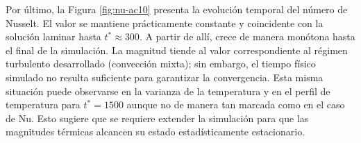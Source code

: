 Por último, la Figura \ref{fig:nu-ac10} presenta la evolución temporal del número de Nusselt. El valor se mantiene prácticamente constante y coincidente con la solución laminar hasta $t^* \approx 300$. A partir de allí, crece de manera monótona hasta el final de la simulación. La magnitud tiende al valor correspondiente al régimen turbulento desarrollado (convección mixta); sin embargo, el tiempo físico simulado no resulta suficiente para garantizar la convergencia. Esta misma situación puede observarse en la varianza de la temperatura y en el perfil de temperatura para $t^*=1500$ aunque no de manera tan marcada como en el caso de Nu. Esto sugiere \linebreak que se requiere extender la simulación para que las magnitudes térmicas alcancen su estado estadísticamente estacionario.




